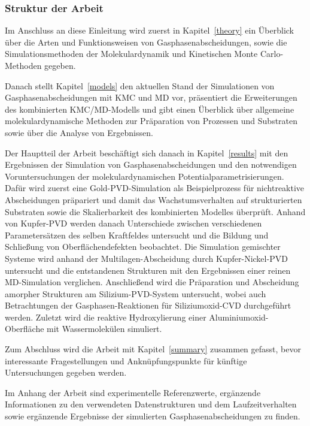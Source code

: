 \subsubsection{Struktur der Arbeit}

Im Anschluss an diese Einleitung wird zuerst in Kapitel~\ref{theory} ein Überblick über die Arten und Funktionsweisen von Gasphasenabscheidungen, sowie die Simulationsmethoden der Molekulardynamik und Kinetischen Monte Carlo-Methoden gegeben.

Danach stellt Kapitel~\ref{models} den aktuellen Stand der Simulationen von Gasphasenabscheidungen mit KMC und MD vor, präsentiert die Erweiterungen des kombinierten KMC/MD-Modells und gibt einen Überblick über allgemeine molekulardynamische Methoden zur Präparation von Prozessen und Substraten sowie über die Analyse von Ergebnissen.

Der Hauptteil der Arbeit beschäftigt sich danach in Kapitel~\ref{results} mit den Ergebnissen der Simulation von Gasphasenabscheidungen und den notwendigen Voruntersuchungen der molekulardynamischen Potentialparametrisierungen.
Dafür wird zuerst eine Gold-PVD-Simulation als Beispielprozess für nichtreaktive Abscheidungen präpariert und damit das Wachstumsverhalten auf strukturierten Substraten sowie die Skalierbarkeit des kombinierten Modelles überprüft.
Anhand von Kupfer-PVD werden danach Unterschiede zwischen verschiedenen Parametersätzen des selben Kraftfeldes untersucht und die Bildung und Schließung von Oberflächendefekten beobachtet.
Die Simulation gemischter Systeme wird anhand der Multilagen-Abscheidung durch Kupfer-Nickel-PVD untersucht und die entstandenen Strukturen mit den Ergebnissen einer reinen MD-Simulation verglichen.
Anschließend wird die Präparation und Abscheidung amorpher Strukturen am Silizium-PVD-System untersucht, wobei auch Betrachtungen der Gasphasen-Reaktionen für Siliziumoxid-CVD durchgeführt werden.
Zuletzt wird die reaktive Hydroxylierung einer Aluminiumoxid-Oberfläche mit Wassermolekülen simuliert.

Zum Abschluss wird die Arbeit mit Kapitel~\ref{summary} zusammen gefasst, bevor interessante Fragestellungen und Anknüpfungspunkte für künftige Untersuchungen gegeben werden.

Im Anhang der Arbeit sind experimentelle Referenzwerte, ergänzende Informationen zu den verwendeten Datenstrukturen und dem Laufzeitverhalten sowie ergänzende Ergebnisse der simulierten Gasphasenabscheidungen zu finden.
